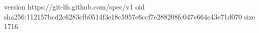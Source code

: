 version https://git-lfs.github.com/spec/v1
oid sha256:112157bcd2c6283cfb0514f3e18c5957e6ccf7e288208fc047e664c43e71d070
size 1716
